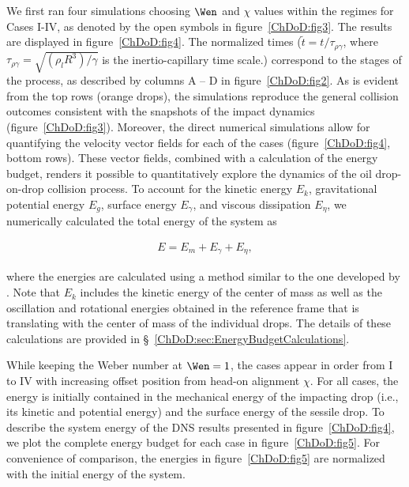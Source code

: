 We first ran four simulations choosing $\Wen$ and $\chi$ values within the regimes for Cases I-IV, as denoted by the open symbols in figure~\ref{ChDoD:fig3}. The results are displayed in figure~\ref{ChDoD:fig4}. The normalized times ($\tilde{t} = t/\tau_{\rho\gamma}$, where $\tau_{\rho\gamma} = \sqrt{\left(\rho_l R^3\right)/\gamma}$ is the inertio-capillary time scale.) correspond to the stages of the process, as described by columns A – D in figure~\ref{ChDoD:fig2}. As is evident from the top rows (orange drops), the simulations reproduce the general collision outcomes consistent with the snapshots of the impact dynamics (figure~\ref{ChDoD:fig3}). Moreover, the direct numerical simulations allow for quantifying the velocity vector fields for each of the cases (figure~\ref{ChDoD:fig4}, bottom rows). These vector fields, combined with a calculation of the energy budget, renders it possible to quantitatively explore the dynamics of the oil drop-on-drop collision process. To account for the kinetic energy $E_k$, gravitational potential energy $E_g$, surface energy $E_\gamma$, and viscous dissipation $E_\eta$, we numerically calculated the total energy of the system as 

\begin{align}
	\label{ChDoD:eq:EnergyBudget}
	E = E_m + E_\gamma + E_\eta,
\end{align}

\noindent where the energies are calculated using a method similar to the one developed by \citet{wildeman2016spreading}.  Note that $E_k$ includes the kinetic energy of the center of mass as well as the oscillation and rotational energies obtained in the reference frame that is translating with the center of mass of the individual drops. The details of these calculations are provided in \S~\ref{ChDoD:sec:EnergyBudgetCalculations}.

While keeping the Weber number at $\Wen = 1$, the cases appear in order from I to IV with increasing offset position from head-on alignment $\chi$. For all cases, the energy is initially contained in the mechanical energy of the impacting drop (i.e., its kinetic and potential energy) and the surface energy of the sessile drop. To describe the system energy of the DNS results presented in figure~\ref{ChDoD:fig4}, we plot the complete energy budget for each case in figure~\ref{ChDoD:fig5}. For convenience of comparison, the energies in figure~\ref{ChDoD:fig5} are normalized with the initial energy of the system.


